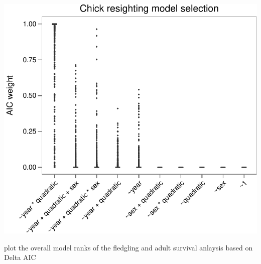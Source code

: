 \documentclass[]{article}
\begin{document}
\begin{center}\includegraphics{Ceuta_ASR_Matrix_Modeling_files/figure-latex/unnamed-chunk-56-1} \end{center}

plot the overall model ranks of the fledgling and adult survival
anlaysis based on Delta AIC
\end{document}
